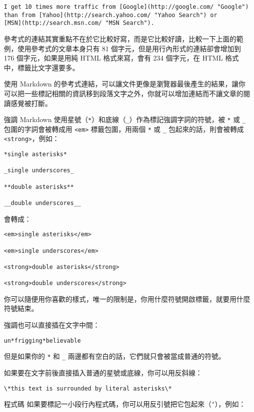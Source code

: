 \begin{verbatim}
I get 10 times more traffic from [Google](http://google.com/ "Google")
than from [Yahoo](http://search.yahoo.com/ "Yahoo Search") or
[MSN](http://search.msn.com/ "MSN Search").
\end{verbatim}
參考式的連結其實重點不在於它比較好寫，而是它比較好讀，比較一下上面的範例，使用參考式的文章本身只有
81 個字元，但是用行內形式的連結卻會增加到 176 個字元，如果是用純 HTML
格式來寫，會有 234 個字元，在 HTML 格式中，標籤比文字還要多。

使用 Markdown
的參考式連結，可以讓文件更像是瀏覽器最後產生的結果，讓你可以把一些標記相關的資訊移到段落文字之外，你就可以增加連結而不讓文章的閱讀感覺被打斷。

強調
Markdown
使用星號（\texttt{*}）和底線（\texttt{\_}）作為標記強調字詞的符號，被
\texttt{*} 或 \texttt{\_} 包圍的字詞會被轉成用
\texttt{\textless{}em\textgreater{}} 標籤包圍，用兩個 \texttt{*} 或
\texttt{\_} 包起來的話，則會被轉成
\texttt{\textless{}strong\textgreater{}}，例如：

\begin{verbatim}
*single asterisks*

_single underscores_

**double asterisks**

__double underscores__
\end{verbatim}
會轉成：

\begin{verbatim}
<em>single asterisks</em>

<em>single underscores</em>

<strong>double asterisks</strong>

<strong>double underscores</strong>
\end{verbatim}
你可以隨便用你喜歡的樣式，唯一的限制是，你用什麼符號開啟標籤，就要用什麼符號結束。

強調也可以直接插在文字中間：

\begin{verbatim}
un*frigging*believable
\end{verbatim}
但是如果你的 \texttt{*} 和 \texttt{\_}
兩邊都有空白的話，它們就只會被當成普通的符號。

如果要在文字前後直接插入普通的星號或底線，你可以用反斜線：

\begin{verbatim}
\*this text is surrounded by literal asterisks\*
\end{verbatim}
程式碼
如果要標記一小段行內程式碼，你可以用反引號把它包起來（\texttt{`}），例如：


